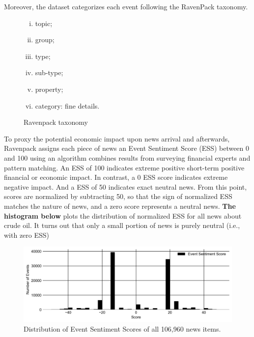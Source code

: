 \documentclass[12pt]{article}
\begin{document}
	\par Moreover, the dataset categorizes each event following the RavenPack taxonomy.
	\begin{figure}[H]
		\centering
		\small
		\begin{enumerate}[(i)]
			\item topic;
			\item group;
			\item type;
			\item sub-type;
			\item property;
			\item category: fine details.
		\end{enumerate}
		\caption{Ravenpack taxonomy  }
	\end{figure}
	\par To proxy the potential economic impact upon news arrival and afterwards, Ravenpack assigns each piece of news an Event Sentiment Score (ESS) between 0 and 100 using an algorithm combines results from surveying financial experts and pattern matching. An ESS of 100 indicates extreme positive short-term positive financial or economic impact. In contrast, a 0 ESS score indicates extreme negative impact. And a ESS of 50 indicates exact neutral news. From this point, scores are normalized by subtracting 50, so that the sign of normalized ESS matches the nature of news, and a zero score represents a neutral news. \textbf{The histogram below} plots the distribution of normalized ESS for all news about crude oil. It turns out that only a small portion of news is purely neutral (i.e., with zero ESS)
	\begin{figure}[H]
		\centering
		\small
		\includegraphics[width=\linewidth]{figures/event_classification/hist_ess_all.png}
		\caption{Distribution of Event Sentiment Scores of all 106,960 news items.}
	\end{figure}
\end{document}
